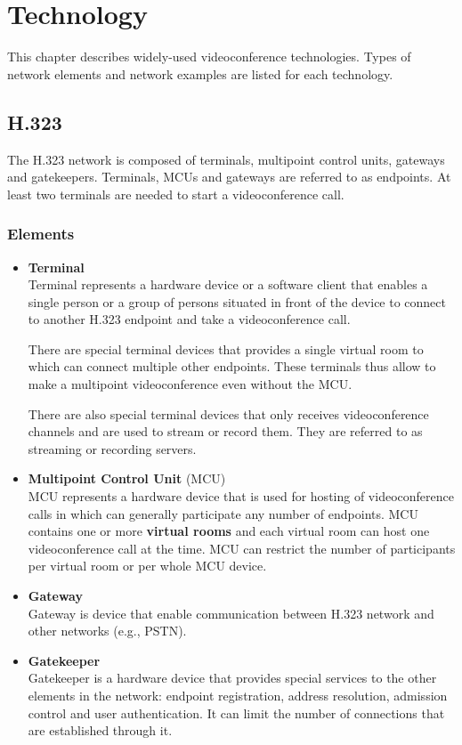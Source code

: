 \chapter{Technology}

This chapter describes widely-used videoconference technologies. Types of 
network elements and network examples are listed for each technology.

\section{H.323}

The H.323 network is composed of terminals, multipoint control units, gateways 
and gatekeepers. Terminals, MCUs and gateways are referred to as endpoints. At 
least two terminals are needed to start a videoconference call.

\subsection{Elements}

\begin{itemize}

\item \textbf{Terminal} \\
Terminal represents a hardware device or a software client that enables a 
single person or a group of persons situated in front of the device to connect 
to another H.323 endpoint and take a videoconference call.

There are special terminal devices that provides a single virtual room to 
which can connect multiple other endpoints.  These terminals thus allow to 
make a multipoint videoconference even without the MCU.

There are also special terminal devices that only receives videoconference 
channels and are used to stream or record them. They are referred to as 
streaming or recording servers.

\item \textbf{Multipoint Control Unit} (MCU) \\
MCU represents a hardware device that is used for hosting of videoconference 
calls in which can generally participate any number of endpoints. MCU contains 
one or more \textbf{virtual rooms} and each virtual room can host one 
videoconference call at the time. MCU can restrict the number of participants 
per virtual room or per whole MCU device.

\item \textbf{Gateway} \\
Gateway is device that enable communication between H.323 network and other 
networks (e.g., PSTN).

\item \textbf{Gatekeeper} \\
Gatekeeper is a hardware device that provides special services to the other 
elements in the network: endpoint registration, address resolution, admission 
control and user authentication. It can limit the number of connections that 
are established through it.

\end{itemize}

